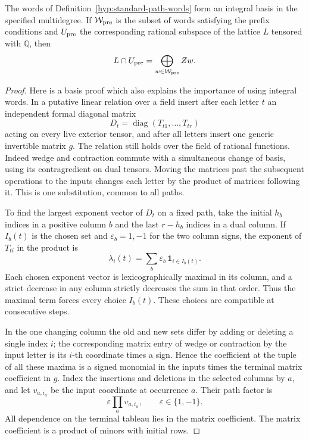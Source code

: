 \begin{lemma}
\label{lem:integral-path-basis}
The words of Definition~\ref{hyp:standard-path-words}
form an integral basis in the specified multidegree. If \(\mathcal W_{\rm pre}\) is the subset of words satisfying the prefix conditions and \(U_{\rm pre}\) the corresponding rational subspace of the lattice \(L\) tensored with \(\mathbb Q\), then
\[
 L\cap U_{\rm pre}=\bigoplus_{w\in\mathcal W_{\rm pre}}\mathbb Z w.
\]

\end{lemma}

\begin{proof}
Here is a basis proof which also explains the importance of using
integral words. In a putative linear relation over a field insert
after each letter \(t\) an independent formal diagonal matrix
\[
 D_t=\operatorname{diag}(T_{t1},\ldots,T_{tr})
\]
acting on every
live exterior tensor, and after all letters insert one generic
invertible matrix \(g\). The relation still holds over the field
of rational functions. Indeed wedge and contraction commute with
a simultaneous change of basis, using its contragredient on dual
tensors. Moving the matrices past the subsequent operations to
the inputs changes each letter by the product of matrices following
it. This is one substitution, common to all paths.

To find the largest exponent vector of \(D_t\) on a fixed
path, take the initial \(h_b\) indices in a positive column \(b\)
and the last \(r-h_b\) indices in a dual column. If \(I_b(t)\)
is the chosen set and \(\varepsilon_b=1,-1\) for the two column
signs, the exponent of \(T_{ti}\) in the product is
\[
 \lambda_i(t)=\sum_b \varepsilon_b\,\mathbf1_{i\in I_b(t)} .
\]
Each chosen exponent vector is lexicographically maximal in its
column, and a strict decrease in any column strictly decreases
the sum in that order. Thus the maximal term forces every
choice \(I_b(t)\). These choices are compatible at consecutive
steps.

In the one changing column the old and new sets differ
by adding or deleting a single index \(i\); the corresponding
matrix entry of wedge or contraction by the input letter is
its \(i\)-th coordinate times a sign. Hence the coefficient
at the tuple of all these maxima is a signed monomial in the
inputs times the terminal matrix coefficient in \(g\). Index the insertions and deletions in the selected columns by \(a\), and let \(v_{a,i_a}\) be the input coordinate at occurrence \(a\). Their path factor is
\[
 \varepsilon\prod_a v_{a,i_a},\qquad \varepsilon\in\{1,-1\}.
\]
All dependence on the terminal tableau lies in the matrix coefficient. The matrix coefficient is a
product of minors with initial rows.


\end{proof}
